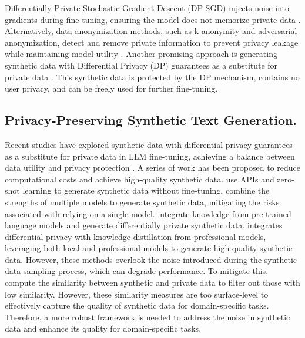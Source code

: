 Differentially Private Stochastic Gradient Descent (DP-SGD) injects noise into gradients during fine-tuning, ensuring the model does not memorize private data \citep{Abadi2016DeepLDP, McMahan2017LearningDP}. 
Alternatively, data anonymization methods, such as k-anonymity and adversarial anonymization, detect and remove private information to prevent privacy leakage while maintaining model utility \citep{Sweeney1997GuaranteeingAW, Romanov2020NaturalTA, robin2024large}. 
Another promising approach is generating synthetic data with Differential Privacy (DP) guarantees as a substitute for private data \citep{yue-etal-2023-synthetic, Flemings2024DifferentiallyPK}. This synthetic data is protected by the DP mechanism, contains no user privacy, and can be freely used for further fine-tuning.



\subsection{Privacy-Preserving Synthetic Text Generation.}
Recent studies have explored synthetic data with differential privacy guarantees as a substitute for private data in LLM fine-tuning, achieving a balance between data utility and privacy protection \citep{yue-etal-2023-synthetic,dayu2024privacy,Kurakin2023HarnessingLM}. 
A series of work has been proposed to reduce computational costs and achieve high-quality synthetic data. 
\citet{Lin2023DifferentiallyPS,Xie2024DifferentiallyPS} use APIs and zero-shot learning to generate synthetic data without fine-tuning. 
\citet{Du2023ImprovingFA} combine the strengths of multiple models to generate synthetic data, mitigating the risks associated with relying on a single model.
\citet{Zou2025ContrastivePD} integrate knowledge from pre-trained language models and generate differentially private synthetic data.
\citet{Wang2024KnowledgeSGPS} integrates differential privacy with knowledge distillation from professional models, leveraging both local and professional models to generate high-quality synthetic data. 
However, these methods overlook the noise introduced during the synthetic data sampling process, which can degrade performance. 
To mitigate this, \citet{dayu2024privacy, Wang2022SelfInstructAL} compute the similarity between synthetic and private data to filter out those with low similarity. 
However, these similarity measures are too surface-level to effectively capture the quality of synthetic data for domain-specific tasks. 
Therefore, a more robust framework is needed to address the noise in synthetic data and enhance its quality for domain-specific tasks.

